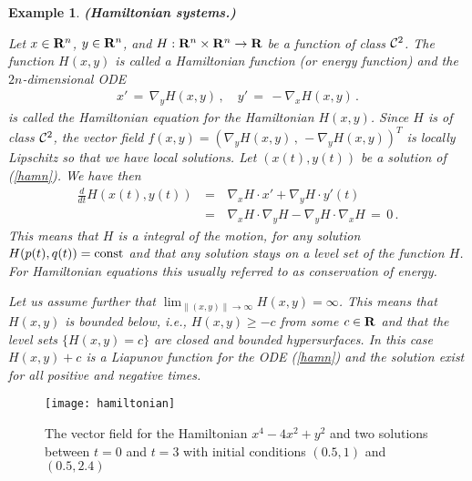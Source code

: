 \documentclass[12pt]{report}
\newcommand{\calC}{{\cal C}}
\newcommand{\bR}{{\bf R}}
\newtheorem{example}[theorem]{Example}
\newcommand{\nn}{\nonumber}
\def\eqref#1{(\ref{#1})}
\def\to{\rightarrow}
\begin{document}
\begin{example}{\bf (Hamiltonian systems.) }{\rm Let $x\in \bR^n$, 
$y\in \bR^n$, and $H: \bR^n \times \bR^n \to \bR$ be a function of
class $\calC^2$.  The function $H(x,y)$ is called a {\em Hamiltonian
function} (or {\em energy function}) and the $2n$-dimensional ODE
\begin{eqnarray}
x'\,=\, \nabla_y H(x,y) \,, \quad 
y' \,=\, -\nabla_x H (x,y) \,. \label{hamn}
\end{eqnarray}
is called the {\em Hamiltonian equation} for the Hamiltonian $H(x,y)$.
Since $H$ is of class $\calC^2$, the vector field $f(x,y)=
(\nabla_y H(x,y)\,,\,-\nabla_y H(x,y) )^T$ is locally Lipschitz 
so that we have local solutions. Let $(x(t),y(t))$ be a solution of \eqref{hamn}. We have then 
\begin{eqnarray} 
\frac{d}{dt} H(x(t),y(t))\,&=&\, \nabla_x H \cdot x'  + \nabla_y H \cdot
y'(t) \nn \\ \,&=&\,  \nabla_x H \cdot \nabla_y H - \nabla_y H \cdot \nabla_x H
\,=\, 0 \,.
\end{eqnarray}
This means that $H$ is a {\em integral of the motion}, for any
solution $H(p(t), q(t))={\rm const}$ and that any solution stays on a
level set of the function $H$.  For Hamiltonian equations this
usually referred to as conservation of energy.
 
Let us assume further that $\lim_{\|(x,y)\| \to \infty} H(x,y) =
\infty$. This means that $H(x,y)$ is bounded below, i.e., $H(x,y) \ge
- c$ from some $c \in \bR$ and that the level sets $\{ H(x,y)=c\}$ are
closed and bounded hypersurfaces.  In this case $H(x,y) + c$ is a
Liapunov function for the ODE \eqref{hamn} and the solution exist for
all positive and negative times. }
\end{example}

\begin{figure}[htbp] 
\begin{center}
\texttt{[image: hamiltonian]}
\caption{The vector field for the Hamiltonian $x^4 - 4x^2 + y^2$ and
two solutions between $t=0$ and $t=3$ with initial conditions
$(0.5,1)$ and $(0.5,2.4)$}
\label{hamvf}
\end{center}
\end{figure}
\end{document}
